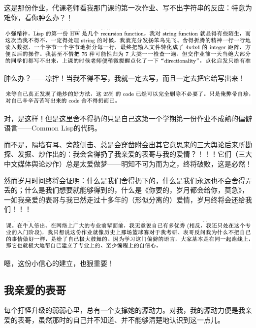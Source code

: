 \documentclass[9pt, b5paper]{article}
\begin{document}
这是那份作业，代课老师看我那门课的第一次作业、写不出字符串的反应：特意为难你，看你肿么办？！

\begin{center}
\includegraphics[width=.9\linewidth]{./pic/backups_plans_20210502_130207.png}
\end{center}

肿么办？——凉拌！当我不得不写，我就一定去写，而且一定去把它给写出来！

\begin{center}
\includegraphics[width=.9\linewidth]{./pic/backups_plans_20210502_114220.png}
\end{center}

对，是这样！但是这里舍不得扔的只是自己这第一个学期第一份作业不成熟的偏僻语言——Common Lisp的代码。

而不是，隔墙有耳、旁敲侧击、总是会穿凿附会出其它意思来的三大舆论后来所勘探、发掘、炒作出的：我会舍得扔了我亲爱的表哥与我的爱情？！！！它们（三大中文媒体舆论炒作）总是太爱做梦——明知不可为而为之，终将破败，这是必然！

然而岁月时间终将会证明：什么是我们舍得扔下的，什么是我们永远也不会舍得弄丢的；什么是我们想要就能够得到的，什么是《你要的，岁月都会给你，莫急》，一如我亲爱的表哥与我已然走过十多年的（形似分离的）爱情，岁月终将会还给我们！！！

\begin{center}
\includegraphics[width=.9\linewidth]{./pic/backups_plans_20210502_114726.png}
\end{center}

嗯，这份小信心的建立，也狠重要！

\subsection{我亲爱的表哥}
\label{sec:org5864140}

每个打怪升级的弱弱心里，总有一个支撑她的源动力。对我，我的源动力便是我亲爱的表哥，虽然那时的自己并不知道、并不能够清楚地认识到这一点儿。
\end{document}
